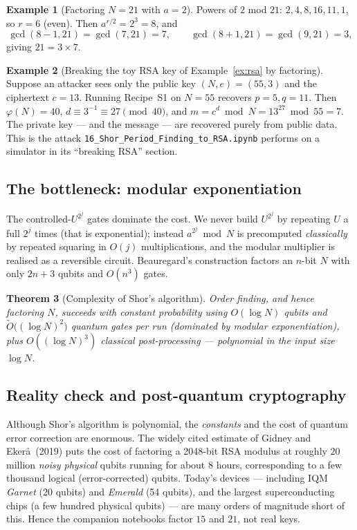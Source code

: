 \documentclass[11pt]{article}
\theoremstyle{plain}
\newtheorem{theorem}{Theorem}[section]
\theoremstyle{definition}
\newtheorem{example}[theorem]{Example}
\theoremstyle{remark}
\begin{document}
\begin{example}[Factoring $N=21$ with $a=2$]\label{ex:21}
Powers of $2$ mod $21$: $2,4,8,16,11,1$, so $r=6$ (even). Then
$a^{r/2}=2^{3}=8$, and
\[
  \gcd(8-1,21)=\gcd(7,21)=7,\qquad \gcd(8+1,21)=\gcd(9,21)=3,
\]
giving $21 = 3\times 7$.
\end{example}

\begin{example}[Breaking the toy RSA key of Example~\ref{ex:rsa} by factoring]
Suppose an attacker sees only the public key $(N,e)=(55,3)$ and the ciphertext $c=13$.
Running Recipe~S1 on $N=55$ recovers $p=5,q=11$. Then
$\varphi(N)=40$, $d\equiv 3^{-1}\equiv 27 \pmod{40}$, and
$m = c^{d}\bmod N = 13^{27}\bmod 55 = 7$. The private key --- and the message --- are
recovered purely from public data. This is the attack \texttt{16\_Shor\_Period\_Finding\_to\_RSA.ipynb} performs on a
simulator in its ``breaking RSA'' section.
\end{example}

\subsection{The bottleneck: modular exponentiation}

The controlled-$U^{2^{j}}$ gates dominate the cost. We never build $U^{2^{j}}$ by repeating
$U$ a full $2^{j}$ times (that is exponential); instead
$a^{2^{j}}\bmod N$ is precomputed \emph{classically} by repeated squaring in $O(j)$
multiplications, and the modular multiplier is realised as a reversible circuit. Beauregard's
construction factors an $n$-bit $N$ with only $2n+3$ qubits and $O(n^{3})$ gates.

\begin{theorem}[Complexity of Shor's algorithm]
Order finding, and hence factoring $N$, succeeds with constant probability using
$O(\log N)$ qubits and $\widetilde{O}\big((\log N)^{2}\big)$ quantum gates per run (dominated
by modular exponentiation), plus $O((\log N)^{3})$ classical post-processing --- polynomial
in the input size $\log N$.
\end{theorem}

\subsection{Reality check and post-quantum cryptography}

Although Shor's algorithm is polynomial, the \emph{constants} and the cost of quantum error
correction are enormous. The widely cited estimate of Gidney and Eker\aa\ (2019) puts the
cost of factoring a 2048-bit RSA modulus at roughly $20$ million \emph{noisy physical} qubits
running for about $8$ hours, corresponding to a few thousand logical (error-corrected) qubits.
Today's devices --- including IQM \emph{Garnet} (20 qubits) and \emph{Emerald} (54 qubits), and
the largest superconducting chips (a few hundred physical qubits) --- are many orders of
magnitude short of this. Hence the companion notebooks factor $15$ and $21$, not real keys.
\end{document}
